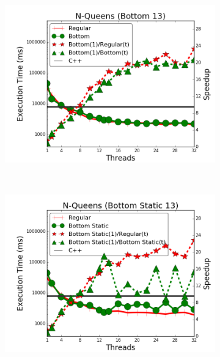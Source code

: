 \begin{figure}[]
        \begin{subfigure}[b]{\plotsize\textwidth}
           \includegraphics[width=\textwidth]{experiments/coordination/cmp-bottom-8queens-13.png}
           \mycap{}
           \label{fig:coordination:coord_13queensbottom}
        \end{subfigure} ~
        \begin{subfigure}[b]{\plotsize\textwidth}
           \includegraphics[width=\textwidth]{experiments/coordination/cmp-bottom-static-8queens-13.png}
           \mycap{}
           \label{fig:coordination:coord_13queensbottomstatic}
        \end{subfigure} \\
        \label{fig:coordination:results_queens-13}
\end{figure}

